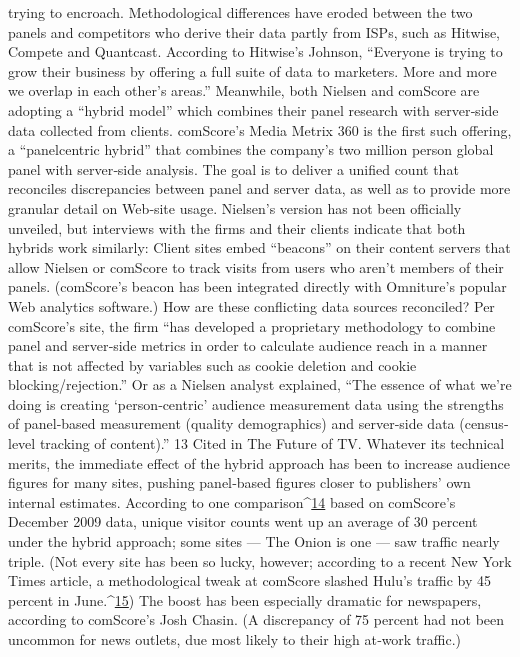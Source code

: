 trying to encroach. Methodological differences have eroded between the
two panels and competitors who derive their data partly from ISPs, such
as Hitwise, Compete and Quantcast. According to Hitwise’s Johnson,
``Everyone is trying to grow their business by offering a full suite of data
to marketers. More and more we overlap in each other’s areas.''
Meanwhile, both Nielsen and comScore are adopting a ``hybrid model''
which combines their panel research with server‐side data collected from
clients. comScore’s Media Metrix 360 is the first such offering, a ``panelcentric
hybrid'' that combines the company’s two million person global
panel with server‐side analysis. The goal is to deliver a unified count that
reconciles discrepancies between panel and server data, as well as to
provide more granular detail on Web‐site usage.
Nielsen’s version has not been officially unveiled, but interviews with the
firms and their clients indicate that both hybrids work similarly: Client
sites embed ``beacons'' on their content servers that allow Nielsen or
comScore to track visits from users who aren’t members of their panels.
(comScore’s beacon has been integrated directly with Omniture’s popular
Web analytics software.)
How are these conflicting data sources reconciled? Per comScore’s site, the
firm ``has developed a proprietary methodology to combine panel and
server‐side metrics in order to calculate audience reach in a manner that is
not affected by variables such as cookie deletion and cookie
blocking/rejection.'' Or as a Nielsen analyst explained, ``The essence of
what we’re doing is creating ‘person‐centric’ audience measurement data
using the strengths of panel‐based measurement (quality demographics)
and server‐side data (census‐level tracking of content).''
13 Cited in The Future of TV.
Whatever its technical merits, the immediate effect of the hybrid approach
has been to increase audience figures for many sites, pushing panel‐based
figures closer to publishers’ own internal estimates. According to one
comparison^{\href{#endnotes}{14}} based on comScore’s December 2009 data, unique visitor
counts went up an average of 30 percent under the hybrid approach; some
sites — The Onion is one — saw traffic nearly triple. (Not every site has
been so lucky, however; according to a recent New York Times article, a
methodological tweak at comScore slashed Hulu’s traffic by 45 percent in
June.^{\href{#endnotes}{15}})
The boost has been especially dramatic for newspapers, according to
comScore’s Josh Chasin. (A discrepancy of 75 percent had not been
uncommon for news outlets, due most likely to their high at‐work traffic.)
